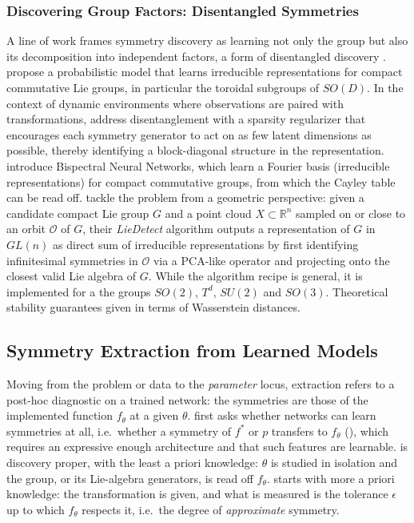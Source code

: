 \documentclass[mathematics,review,submit,moreauthors]{Definitions/mdpi}
\begin{document}
\subsubsection{Discovering Group Factors: Disentangled Symmetries}
A line of work frames symmetry discovery as learning not only the group but also its decomposition into independent factors, a form of disentangled discovery \citep{higgins2018}.
\citet{cohen2014} propose a probabilistic model that learns irreducible representations for compact commutative Lie groups, in particular the toroidal subgroups of $SO(D)$.
In the context of dynamic environments where observations are paired with transformations, \citet{quessard2020anips} address disentanglement with a sparsity regularizer that encourages each symmetry generator to act on as few latent dimensions as possible, thereby identifying a block-diagonal structure in the representation.
\citet{sanborn2022} introduce Bispectral Neural Networks, which learn a Fourier basis (irreducible representations) for compact commutative groups, from which the Cayley table can be read off.
\citet{ennes2025fcm} tackle the problem from a geometric perspective: given a candidate compact Lie group $G$ and a point cloud $X\subset \mathbb R^n$ sampled on or close to an orbit $\mathcal O$ of $G$, their \textit{LieDetect} algorithm outputs a representation of $G$ in $GL(n)$ as direct sum of irreducible representations by first identifying infinitesimal symmetries in $\mathcal O$ via a PCA-like operator and projecting onto the closest valid Lie algebra of $G$.
While the algorithm recipe is general, it is implemented for a the groups $SO(2)$, $T^d$, $SU(2)$ and $SO(3)$.
Theoretical stability guarantees given in terms of Wasserstein distances.



\subsection{Symmetry Extraction from Learned Models}\label{sec:sym-extract-model}
Moving from the problem or data to the \emph{parameter} locus, extraction refers to a post-hoc diagnostic on a trained network: the symmetries are those of the implemented function $f_\theta$ at a given $\theta$.
 first asks whether networks can learn symmetries at all, i.e.\ whether a symmetry of $f^*$ or $p$ transfers to $f_\theta$ (), which requires an expressive enough architecture and that such features are learnable.
 is discovery proper, with the least a priori knowledge: $\theta$ is studied in isolation and the group, or its Lie-algebra generators, is read off $f_\theta$.
 starts with more a priori knowledge: the transformation is given, and what is measured is the tolerance $\epsilon$ up to which $f_\theta$ respects it, i.e.\ the degree of \emph{approximate} symmetry.
\end{document}
